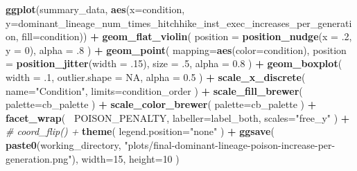 \documentclass[]{book}
\newenvironment{Shaded}{\begin{snugshade}}{\end{snugshade}}
\newcommand{\CommentTok}[1]{\textcolor[rgb]{0.56,0.35,0.01}{\textit{#1}}}
\newcommand{\DataTypeTok}[1]{\textcolor[rgb]{0.13,0.29,0.53}{#1}}
\newcommand{\DecValTok}[1]{\textcolor[rgb]{0.00,0.00,0.81}{#1}}
\newcommand{\FloatTok}[1]{\textcolor[rgb]{0.00,0.00,0.81}{#1}}
\newcommand{\KeywordTok}[1]{\textcolor[rgb]{0.13,0.29,0.53}{\textbf{#1}}}
\newcommand{\NormalTok}[1]{#1}
\newcommand{\OperatorTok}[1]{\textcolor[rgb]{0.81,0.36,0.00}{\textbf{#1}}}
\newcommand{\OtherTok}[1]{\textcolor[rgb]{0.56,0.35,0.01}{#1}}
\newcommand{\StringTok}[1]{\textcolor[rgb]{0.31,0.60,0.02}{#1}}
\begin{document}
\begin{Shaded}
\begin{Highlighting}[]
\KeywordTok{ggplot}\NormalTok{(summary_data, }\KeywordTok{aes}\NormalTok{(}\DataTypeTok{x=}\NormalTok{condition, }\DataTypeTok{y=}\NormalTok{dominant_lineage_num_times_hitchhike_inst_exec_increases_per_generation, }\DataTypeTok{fill=}\NormalTok{condition)) }\OperatorTok{+}
\StringTok{  }\KeywordTok{geom_flat_violin}\NormalTok{(}
    \DataTypeTok{position =} \KeywordTok{position_nudge}\NormalTok{(}\DataTypeTok{x =} \FloatTok{.2}\NormalTok{, }\DataTypeTok{y =} \DecValTok{0}\NormalTok{),}
    \DataTypeTok{alpha =} \FloatTok{.8}
\NormalTok{  ) }\OperatorTok{+}
\StringTok{  }\KeywordTok{geom_point}\NormalTok{(}
    \DataTypeTok{mapping=}\KeywordTok{aes}\NormalTok{(}\DataTypeTok{color=}\NormalTok{condition),}
    \DataTypeTok{position =} \KeywordTok{position_jitter}\NormalTok{(}\DataTypeTok{width =} \FloatTok{.15}\NormalTok{),}
    \DataTypeTok{size =} \FloatTok{.5}\NormalTok{,}
    \DataTypeTok{alpha =} \FloatTok{0.8}
\NormalTok{  ) }\OperatorTok{+}
\StringTok{  }\KeywordTok{geom_boxplot}\NormalTok{(}
    \DataTypeTok{width =} \FloatTok{.1}\NormalTok{,}
    \DataTypeTok{outlier.shape =} \OtherTok{NA}\NormalTok{,}
    \DataTypeTok{alpha =} \FloatTok{0.5}
\NormalTok{  ) }\OperatorTok{+}
\StringTok{  }\KeywordTok{scale_x_discrete}\NormalTok{(}
    \DataTypeTok{name=}\StringTok{"Condition"}\NormalTok{,}
    \DataTypeTok{limits=}\NormalTok{condition_order}
\NormalTok{  ) }\OperatorTok{+}
\StringTok{  }\KeywordTok{scale_fill_brewer}\NormalTok{(}
    \DataTypeTok{palette=}\NormalTok{cb_palette}
\NormalTok{  ) }\OperatorTok{+}
\StringTok{  }\KeywordTok{scale_color_brewer}\NormalTok{(}
    \DataTypeTok{palette=}\NormalTok{cb_palette}
\NormalTok{  ) }\OperatorTok{+}
\StringTok{  }\KeywordTok{facet_wrap}\NormalTok{(}
    \OperatorTok{~}\NormalTok{POISON_PENALTY,}
    \DataTypeTok{labeller=}\NormalTok{label_both,}
    \DataTypeTok{scales=}\StringTok{"free_y"}
\NormalTok{  ) }\OperatorTok{+}
\StringTok{  }\CommentTok{# coord_flip() +}
\StringTok{  }\KeywordTok{theme}\NormalTok{(}
    \DataTypeTok{legend.position=}\StringTok{"none"}
\NormalTok{  ) }\OperatorTok{+}
\StringTok{  }\KeywordTok{ggsave}\NormalTok{(}
    \KeywordTok{paste0}\NormalTok{(working_directory, }\StringTok{"plots/final-dominant-lineage-poison-increase-per-generation.png"}\NormalTok{),}
    \DataTypeTok{width=}\DecValTok{15}\NormalTok{,}
    \DataTypeTok{height=}\DecValTok{10}
\NormalTok{  )}
\end{Highlighting}
\end{Shaded}
\end{document}
